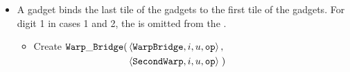\begin{itemize}
\begin{itemize}
            \end{itemize}
        \vspace{.5cm}

        \item A {\warpbridge} gadget binds the last tile of the {\firstwarp} gadgets to the
             first tile of the {\secondwarp} gadgets. For digit 1 in cases 1 and 2, the
             {\warpbridge} is omitted from the {\warpunit}.

        \begin{itemize}
            \item Create
            $\begin{aligned}[t]
                {\tt Warp\_Bridge}(& \left\langle {\tt WarpBridge}, i, u, {\tt op} \right\rangle, \\
                            & \left\langle {\tt SecondWarp}, i, u, {\tt op} \right\rangle \;)
            \end{aligned}$
            \vspace{.5cm}
        \end{itemize}


\end{itemize}
